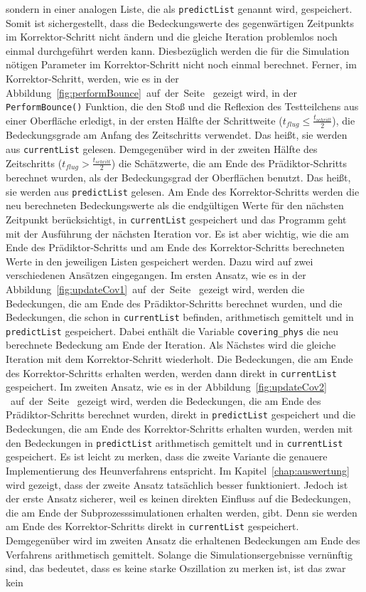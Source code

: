 \documentclass{listhesis}
\begin{document}
sondern in einer analogen Liste, die als \texttt{predictList} genannt wird, gespeichert. Somit ist sichergestellt, dass die Bedeckungswerte des gegenwärtigen Zeitpunkts im Korrektor-Schritt nicht ändern und die gleiche Iteration problemlos noch einmal durchgeführt werden kann. Diesbezüglich werden die für die Simulation nötigen Parameter im Korrektor-Schritt nicht noch einmal berechnet. Ferner, im Korrektor-Schritt, werden, wie es in der Abbildung~\ref{fig:performBounce}~auf~der~Seite~\pageref{fig:performBounce} gezeigt wird, in der \texttt{PerformBounce()} Funktion, die den Stoß und die Reflexion des Testteilchens aus einer Oberfläche erledigt, in der ersten Hälfte der Schrittweite ($t_{flug} \le \frac{t_{schritt}}{2}$), die Bedeckungsgrade am Anfang des Zeitschritts verwendet. Das heißt, sie werden aus \texttt{currentList} gelesen. Demgegenüber wird in der zweiten Hälfte des Zeitschritts ($t_{flug} > \frac{t_{schritt}}{2}$) die Schätzwerte, die am Ende des Prädiktor-Schritts berechnet wurden, als der Bedeckungsgrad der Oberflächen benutzt. Das heißt, sie werden aus \texttt{predictList} gelesen. Am Ende des Korrektor-Schritts werden die neu berechneten Bedeckungswerte als die endgültigen Werte für den nächsten Zeitpunkt berücksichtigt, in \texttt{currentList} gespeichert und das Programm geht mit der Ausführung der nächsten Iteration vor. Es ist aber wichtig, wie die am Ende des Prädiktor-Schritts und am Ende des Korrektor-Schritts berechneten Werte in den jeweiligen Listen gespeichert werden. Dazu wird auf zwei verschiedenen Ansätzen eingegangen. Im ersten Ansatz, wie es in der Abbildung~\ref{fig:updateCov1}~auf~der~Seite~\pageref{fig:updateCov1} gezeigt wird, werden die Bedeckungen, die am Ende des Prädiktor-Schritts berechnet wurden, und die Bedeckungen, die schon in \texttt{currentList} befinden, arithmetisch gemittelt und in \texttt{predictList} gespeichert. Dabei enthält die Variable \texttt{covering\_phys} die neu berechnete Bedeckung am Ende der Iteration. Als Nächstes wird die gleiche Iteration mit dem Korrektor-Schritt wiederholt. Die Bedeckungen, die am Ende des Korrektor-Schritts erhalten werden, werden dann direkt in \texttt{currentList} gespeichert. Im zweiten Ansatz, wie es in der Abbildung~\ref{fig:updateCov2} ~auf~der~Seite~\pageref{fig:updateCov2} gezeigt wird, werden die Bedeckungen, die am Ende des Prädiktor-Schritts berechnet wurden, direkt in \texttt{predictList} gespeichert und die Bedeckungen, die am Ende des Korrektor-Schritts erhalten wurden, werden mit den Bedeckungen in \texttt{predictList} arithmetisch gemittelt und in \texttt{currentList} gespeichert. Es ist leicht zu merken, dass die zweite Variante die genauere Implementierung des Heunverfahrens entspricht. Im Kapitel~\ref{chap:auswertung} wird gezeigt, dass der zweite Ansatz tatsächlich besser funktioniert. Jedoch ist der erste Ansatz sicherer, weil es keinen direkten Einfluss auf die Bedeckungen, die am Ende der Subprozesssimulationen erhalten werden, gibt. Denn sie werden am Ende des Korrektor-Schritts direkt in \texttt{currentList} gespeichert. Demgegenüber wird im zweiten Ansatz die erhaltenen Bedeckungen am Ende des Verfahrens arithmetisch gemittelt. Solange die Simulationsergebnisse vernünftig sind, das bedeutet, dass es keine starke Oszillation zu merken ist, ist das zwar kein 
\end{document}
